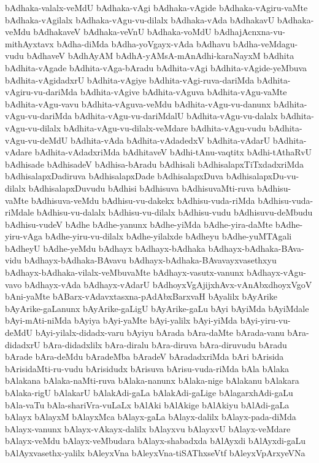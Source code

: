 {bAdhaka-valalx-veMdU
bAdhaka-vAgi
bAdhaka-vAgide
bAdhaka-vAgiru-vaMte
bAdhaka-vAgilalx
bAdhaka-vAgu-vu-dilalx
bAdhaka-vAda
bAdhakavU
bAdhaka-veMdu
bAdhakaveV
bAdhaka-veVnU
bAdhaka-voMdU
bAdhajAcnxna-vu-mithAyxtavx
bAdha-diMda
bAdha-yoVgayx-vAda
bAdhavu
bAdha-veMdagu-vudu
bAdhaveV
bAdhAyAM
bAdhA-yAMsA-mAnAdhi-karaNayxM
bAdhita
bAdhita-vAgade
bAdhita-vAga-bAradu
bAdhita-vAgi
bAdhita-vAgide-yeMbuva
bAdhita-vAgidadxrU
bAdhita-vAgiye
bAdhita-vAgi-ruva-dariMda
bAdhita-vAgiru-vu-dariMda
bAdhita-vAgive
bAdhita-vAguva
bAdhita-vAgu-vaMte
bAdhita-vAgu-vavu
bAdhita-vAguva-veMdu
bAdhita-vAgu-vu-danunx
bAdhita-vAgu-vu-dariMda
bAdhita-vAgu-vu-dariMdalU
bAdhita-vAgu-vu-dalalx
bAdhita-vAgu-vu-dilalx
bAdhita-vAgu-vu-dilalx-veMdare
bAdhita-vAgu-vudu
bAdhita-vAgu-vu-deMdU
bAdhita-vAda
bAdhita-vAdadedxV
bAdhita-vAdarU
bAdhita-vAdare
bAdhita-vAdadxriMda
bAdhitaveV
bAdhi-tAnu-vaqtitx
bAdhi-tAthaRvU
bAdhisade
bAdhisadeV
bAdhisa-bAradu
bAdhisali
bAdhisalapxTiTxdadxriMda
bAdhisalapxDadiruva
bAdhisalapxDade
bAdhisalapxDuva
bAdhisalapxDu-vu-dilalx
bAdhisalapxDuvudu
bAdhisi
bAdhisuva
bAdhisuvaMti-ruva
bAdhisu-vaMte
bAdhisuva-veMdu
bAdhisu-vu-dakekx
bAdhisu-vuda-riMda
bAdhisu-vuda-riMdale
bAdhisu-vu-dalalx
bAdhisu-vu-dilalx
bAdhisu-vudu
bAdhisuvu-deMbudu
bAdhisu-vudeV
bAdhe
bAdhe-yanunx
bAdhe-yiMda
bAdhe-yira-daMte
bAdhe-yiru-vAga
bAdhe-yiru-vu-dilalx
bAdhe-yilalxde
bAdheyu
bAdhe-yuMTAgali
bAdheyU
bAdhe-yeMdu
bAdhayx
bAdhayx-bAdhaka
bAdhayx-bAdhaka-BAva-vidu
bAdhayx-bAdhaka-BAvavu
bAdhayx-bAdhaka-BAvavayxvasethxyu
bAdhayx-bAdhaka-vilalx-veMbuvaMte
bAdhayx-vasutx-vanunx
bAdhayx-vAgu-vavo
bAdhayx-vAda
bAdhayx-vAdarU
bAdhoyxVgAjijxhAvx-vAnAbxdhoyxVgoV
bAni-yaMte
bABarx-vAdavxtasxna-pAdAbxBarxvaH
bAyalilx
bAyArike
bAyArike-gaLanunx
bAyArike-gaLigU
bAyArike-gaLu
bAyi
bAyiMda
bAyiMdale
bAyi-mAti-niMda
bAyiya
bAyi-yaMte
bAyi-yalilx
bAyi-yiMda
bAyi-yiru-vu-deMdU
bAyi-yilalx-didadx-varu
bAyiyu
bArada
bAra-daMte
bArada-vanu
bAra-didadxrU
bAra-didadxlilx
bAra-diralu
bAra-diruva
bAra-diruvudu
bAradu
bArade
bAra-deMdu
bAradeMba
bAradeV
bAradadxriMda
bAri
bArisida
bArisidaMti-ru-vudu
bArisidudx
bArisuva
bArisu-vuda-riMda
bAla
bAlaka
bAlakana
bAlaka-naMti-ruva
bAlaka-nanunx
bAlaka-nige
bAlakanu
bAlakara
bAlaka-rigU
bAlakarU
bAlakAdi-gaLa
bAlakAdi-gaLige
bAlagarxhAdi-gaLu
bAla-vaTu
bAla-shariVra-vuLaLx
bAlAki
bAlAkige
bAlAkiyu
bAlAdi-gaLa
bAlayx
bAlayxM
bAlayxMca
bAlayx-gaLa
bAlayx-dalilx
bAlayx-pada-diMda
bAlayx-vanunx
bAlayx-vAkayx-dalilx
bAlayxvu
bAlayxvU
bAlayx-veMdare
bAlayx-veMdu
bAlayx-veMbudara
bAlayx-shabadxda
bAlAyxdi
bAlAyxdi-gaLu
bAlAyxvasethx-yalilx
bAleyxVna
bAleyxVna-tiSAThxseVtf
bAleyxVpArxyeVNa
}
